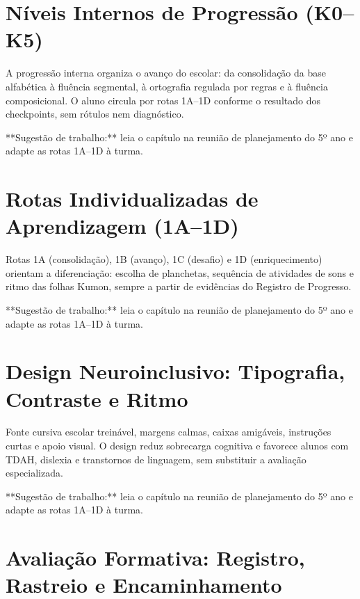 \chapter{Níveis Internos de Progressão (K0–K5)}

A progressão interna organiza o avanço do escolar: da consolidação da base alfabética à fluência segmental, à ortografia regulada por regras e à fluência composicional. O aluno circula por rotas 1A–1D conforme o resultado dos checkpoints, sem rótulos nem diagnóstico.


\begin{dica}
**Sugestão de trabalho:** leia o capítulo na reunião de planejamento do 5º ano e adapte as rotas 1A–1D à turma.
\end{dica}

\chapter{Rotas Individualizadas de Aprendizagem (1A–1D)}

Rotas 1A (consolidação), 1B (avanço), 1C (desafio) e 1D (enriquecimento) orientam a diferenciação: escolha de planchetas, sequência de atividades de sons e ritmo das folhas Kumon, sempre a partir de evidências do Registro de Progresso.


\begin{dica}
**Sugestão de trabalho:** leia o capítulo na reunião de planejamento do 5º ano e adapte as rotas 1A–1D à turma.
\end{dica}

\chapter{Design Neuroinclusivo: Tipografia, Contraste e Ritmo}

Fonte cursiva escolar treinável, margens calmas, caixas amigáveis, instruções curtas e apoio visual. O design reduz sobrecarga cognitiva e favorece alunos com TDAH, dislexia e transtornos de linguagem, sem substituir a avaliação especializada.


\begin{dica}
**Sugestão de trabalho:** leia o capítulo na reunião de planejamento do 5º ano e adapte as rotas 1A–1D à turma.
\end{dica}

\chapter{Avaliação Formativa: Registro, Rastreio e Encaminhamento}

